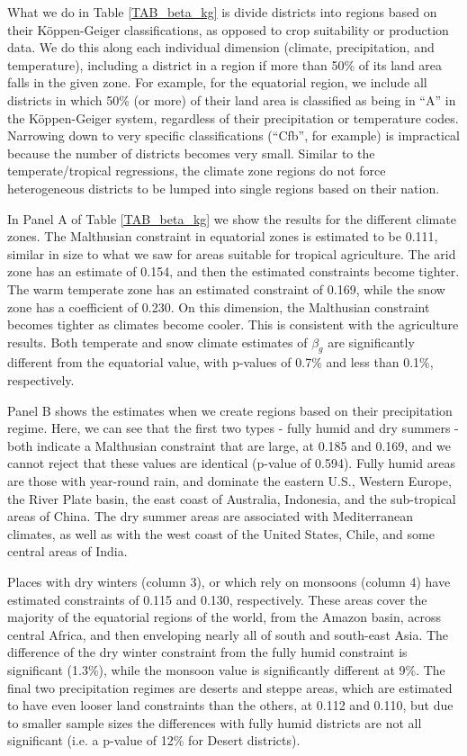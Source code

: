 \documentclass[11pt]{article}
\begin{document}
What we do in Table \ref{TAB_beta_kg} is divide districts into regions based on their K{\"o}ppen-Geiger classifications, as opposed to crop suitability or production data. We do this along each individual dimension (climate, precipitation, and temperature), including a district in a region if more than 50\% of its land area falls in the given zone. For example, for the equatorial region, we include all districts in which 50\% (or more) of their land area is classified as being in ``A'' in the K{\"o}ppen-Geiger system, regardless of their precipitation or temperature codes. Narrowing down to very specific classifications (``Cfb'', for example) is impractical because the number of districts becomes very small. Similar to the temperate/tropical regressions, the climate zone regions do not force heterogeneous districts to be lumped into single regions based on their nation. 

In Panel A of Table \ref{TAB_beta_kg} we show the results for the different climate zones. The Malthusian constraint in equatorial zones is estimated to be 0.111, similar in size to what we saw for areas suitable for tropical agriculture. The arid zone has an estimate of 0.154, and then the estimated constraints become tighter. The warm temperate zone has an estimated constraint of 0.169, while the snow zone has a coefficient of 0.230. On this dimension, the Malthusian constraint becomes tighter as climates become cooler. This is consistent with the agriculture results. Both temperate and snow climate estimates of $\beta_g$ are significantly different from the equatorial value, with p-values of 0.7\% and less than 0.1\%, respectively.

Panel B shows the estimates when we create regions based on their precipitation regime. Here, we can see that the first two types - fully humid and dry summers - both indicate a Malthusian constraint that are large, at 0.185 and 0.169, and we cannot reject that these values are identical (p-value of 0.594). Fully humid areas are those with year-round rain, and dominate the eastern U.S., Western Europe, the River Plate basin, the east coast of Australia, Indonesia, and the sub-tropical areas of China. The dry summer areas are associated with Mediterranean climates, as well as with the west coast of the United States, Chile, and some central areas of India.

Places with dry winters (column 3), or which rely on monsoons (column 4) have estimated constraints of 0.115 and 0.130, respectively. These areas cover the majority of the equatorial regions of the world, from the Amazon basin, across central Africa, and then enveloping nearly all of south and south-east Asia. The difference of the dry winter constraint from the fully humid constraint is significant (1.3\%), while the monsoon value is significantly different at 9\%. The final two precipitation regimes are deserts and steppe areas, which are estimated to have even looser land constraints than the others, at 0.112 and 0.110, but due to smaller sample sizes the differences with fully humid districts are not all significant (i.e. a p-value of 12\% for Desert districts).
\end{document}
